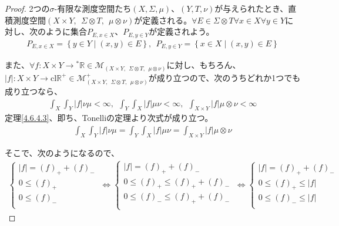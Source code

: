 \documentclass[dvipdfmx]{jsarticle}
\begin{document}
\begin{proof}
2つの$\sigma$-有限な測度空間たち$(X,\varSigma,\mu)$、$(Y,T,\nu)$が与えられたとき、直積測度空間$(X \times Y,\ \ \varSigma \otimes T,\ \ \mu \otimes \nu)$が定義される。$\forall E \in \varSigma \otimes T\forall x \in X\forall y \in Y$に対し、次のように集合$P_{E,x \in X}$、$P_{E,y \in Y}$が定義されよう。
\begin{align*}
P_{E,x \in X} = \left\{ y \in Y \middle| (x,y) \in E \right\},\ \ P_{E,y \in Y} = \left\{ x \in X \middle| (x,y) \in E \right\}
\end{align*}\par
また、$\forall f:X \times Y \rightarrow{}^{*}\mathbb{R} \in \mathcal{M}_{(X \times Y,\ \ \varSigma \otimes T,\ \ \mu \otimes \nu)}$に対し、もちろん、$|f|:X \times Y \rightarrow \mathrm{cl}\mathbb{R}^{+} \in \mathcal{M}_{(X \times Y,\ \ \varSigma \otimes T,\ \ \mu \otimes \nu)}^{+}$が成り立つので、次のうちどれか1つでも成り立つなら、
\begin{align*}
\int_{X} {\int_{Y} {|f|\nu}\mu} < \infty,\ \ \int_{Y} {\int_{X} {|f|\mu}\nu} < \infty,\ \ \int_{X \times Y} {|f|\mu \otimes \nu} < \infty
\end{align*}
定理\ref{4.6.4.3}、即ち、Tonelliの定理より次式が成り立つ。
\begin{align*}
\int_{X} {\int_{Y} {|f|\nu}\mu} = \int_{Y} {\int_{X} {|f|\mu}\nu} = \int_{X \times Y} {|f|\mu \otimes \nu}
\end{align*}\par
そこで、次のようになるので、
\begin{align*}
\left\{ \begin{matrix}
|f| = (f)_{+} + (f)_{-} \\
0 \leq (f)_{+} \\
0 \leq (f)_{-} \\
\end{matrix} \right.\  \Leftrightarrow \left\{ \begin{matrix}
|f| = (f)_{+} + (f)_{-} \\
0 \leq (f)_{+} \leq (f)_{+} + (f)_{-} \\
0 \leq (f)_{-} \leq (f)_{+} + (f)_{-} \\
\end{matrix} \right.\  \Leftrightarrow \left\{ \begin{matrix}
|f| = (f)_{+} + (f)_{-} \\
0 \leq (f)_{+} \leq |f| \\
0 \leq (f)_{-} \leq |f| \\
\end{matrix} \right.\ 

\end{align*}
\end{proof}
\end{document}
